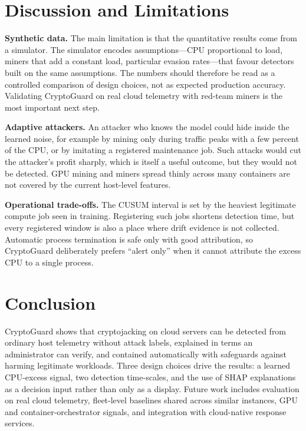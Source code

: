 \documentclass[conference]{IEEEtran}
\begin{document}


\section{Discussion and Limitations}
\textbf{Synthetic data.} The main limitation is that the quantitative results come from a simulator. The simulator encodes assumptions---CPU proportional to load, miners that add a constant load, particular evasion rates---that favour detectors built on the same assumptions. The numbers should therefore be read as a controlled comparison of design choices, not as expected production accuracy. Validating CryptoGuard on real cloud telemetry with red-team miners is the most important next step.

\textbf{Adaptive attackers.} An attacker who knows the model could hide inside the learned noise, for example by mining only during traffic peaks with a few percent of the CPU, or by imitating a registered maintenance job. Such attacks would cut the attacker's profit sharply, which is itself a useful outcome, but they would not be detected. GPU mining and miners spread thinly across many containers are not covered by the current host-level features.

\textbf{Operational trade-offs.} The CUSUM interval is set by the heaviest legitimate compute job seen in training. Registering such jobs shortens detection time, but every registered window is also a place where drift evidence is not collected. Automatic process termination is safe only with good attribution, so CryptoGuard deliberately prefers ``alert only'' when it cannot attribute the excess CPU to a single process.

\section{Conclusion}
CryptoGuard shows that cryptojacking on cloud servers can be detected from ordinary host telemetry without attack labels, explained in terms an administrator can verify, and contained automatically with safeguards against harming legitimate workloads. Three design choices drive the results: a learned CPU-excess signal, two detection time-scales, and the use of SHAP explanations as a decision input rather than only as a display. Future work includes evaluation on real cloud telemetry, fleet-level baselines shared across similar instances, GPU and container-orchestrator signals, and integration with cloud-native response services.
\end{document}
